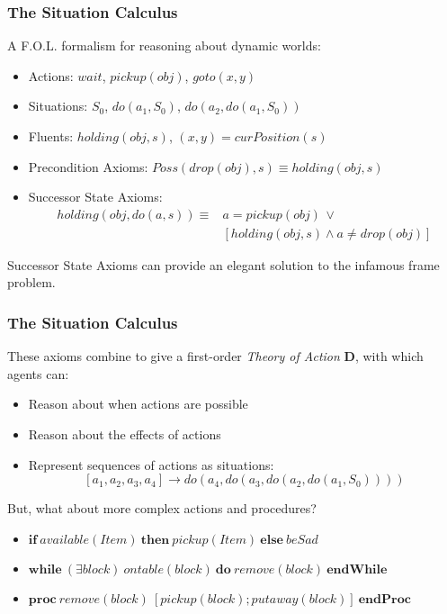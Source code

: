 \documentclass{beamer}
\begin{document}
\begin{frame}
\frametitle{The Situation Calculus}

A F.O.L. formalism for reasoning about dynamic worlds:

\begin{itemize}
\pause
\item Actions: $wait$, $pickup(obj)$, $goto(x,y)$
\pause
\item Situations: $S_{0}$, $do(a_{1},S_{0})$, $do(a_{2},do(a_{1},S_{0}))$
\pause
\item Fluents: $holding(obj,s)$, $(x,y)=curPosition(s)$
\pause
\item Precondition Axioms: $Poss(drop(obj),s) \equiv holding(obj,s)$
\pause
\item Successor State Axioms:\[
\begin{array}{cc}
holding(obj,do(a,s))\equiv & a=pickup(obj)\,\vee\\
 & \left[holding(obj,s)\wedge a\neq drop(obj)\right]\end{array}\]
\end{itemize}
\pause
Successor State Axioms can provide an elegant solution to the infamous
frame problem.
\end{frame}


\begin{frame}
\frametitle{The Situation Calculus}
These axioms combine to give a first-order \emph{Theory of Action} $\mathbf{D}$,
 with which agents can:
\begin{itemize}
  \item Reason about when actions are possible
  \item Reason about the effects of actions
  \item Represent sequences of actions as situations:\[
\left[a_1, a_2, a_3, a_4\right] \rightarrow do(a_4,do(a_3,do(a_2,do(a_1,S_0))))
\]
\end{itemize}
\pause
But, what about more complex actions and procedures?
\begin{itemize}
  \item $\mathbf{if}\ available(Item)\ \mathbf{then}\ pickup(Item)\ \mathbf{else}\ beSad$
  \item $\mathbf{while}\ (\exists block)\ ontable(block)\ \mathbf{do}\ remove(block)\ \mathbf{endWhile}$
  \item $\mathbf{proc}\ remove(block)\ [pickup(block);putaway(block)]\ \mathbf{endProc}$
\end{itemize}
\end{frame}
\end{document}
